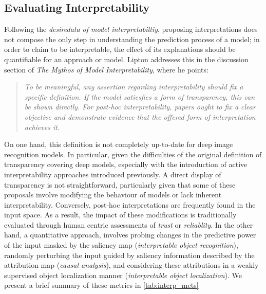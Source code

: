 \subsection{Evaluating Interpretability}
\label{rel:sub_evl}
Following the \emph{desiredata of model interpretabiltiy}, proposing interpretations 
does not compose the only step in understanding the prediction process of a model; in order to 
claim to be interpretable, the effect of its explanations should be quantifiable for an approach 
or model. Lipton addresses this in the discussion section of \emph{The Mythos of Model 
Interpretability}, where he points: 
\begin{quote}
	\emph{To be meaningful, any assertion regarding interpretability should fix a specific 
	definition. If the model satiesfies a form of transparency, this can be shown directly. 
	For post-hoc interpretability, papers ought to fix a clear objective and demonstrate evidence 
	that the offered form of interpretation achieves it.}
\end{quote}
On one hand, this definition is not completely up-to-date for deep image recognition 
models. In particular, given the difficulties of the original definition of transparency covering 
deep models, especially with the introduction of active interpretability approaches introduced 
previously. A direct display of transparency is not straightforward, particularly given that some 
of these proposals involve modifying the behaviour of models or lack inherent interpretability. 
Conversely, post-hoc interpretations are frequently found in the input space. As a result, 
the impact of these modifications is traditionally evaluated through human centric assessments of 
\emph{trust} or \emph{reliablity}. In the other hand, a quantitative approach, involves probing changes 
in the predictive power of the input masked by the saliency map (\emph{interpretable object 
recognition}), randomly perturbing the input guided by saliency information described by the 
attribution map (\emph{causal analysis}), and considering these attributions in a weakly supervised 
object localization manner (\emph{interpretable object localization}). We present a brief summary 
of these metrics in \autoref{tab:interp_mets}


